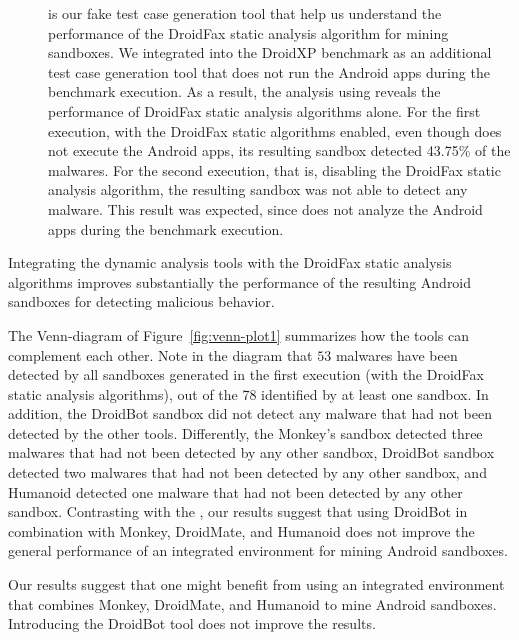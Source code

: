 \begin{description}
  \item[\joke] is our fake test case generation tool that help us understand the performance of the DroidFax static analysis algorithm for mining sandboxes.
    We integrated \joke into the DroidXP benchmark as an additional test case generation tool that does not run the Android apps during the benchmark execution.
    As a result, the analysis using \joke reveals the performance of DroidFax static analysis algorithms alone. For the first execution, with the DroidFax static
    algorithms enabled, even though \joke does not execute the Android apps, its resulting sandbox detected 43.75\% of the malwares. For the second execution,
    that is, disabling the DroidFax static analysis algorithm, the resulting \joke sandbox was not able to detect any malware. This result
    was expected, since \joke does not analyze the Android apps during the benchmark execution.

\end{description}


\begin{finding}
  Integrating the dynamic analysis tools
  with the DroidFax static analysis algorithms
  improves substantially the performance
  of the resulting Android sandboxes for
  detecting malicious behavior. 
\end{finding}
 
The Venn-diagram of Figure~\ref{fig:venn-plot1}
summarizes how the tools can complement each other.
Note in the diagram that $53$ malwares have been detected by all sandboxes generated in the first execution (with the DroidFax static analysis algorithms), out of the 78 identified by at least one sandbox. In addition, the DroidBot sandbox did not detect any malware that had not been detected by the other tools. Differently, the Monkey's sandbox detected three malwares that had not been detected by any other sandbox, DroidBot sandbox detected two malwares that had not been detected by any other sandbox, and Humanoid detected one malware that had not been detected by any other sandbox. Contrasting with the \blls,
our results suggest that using DroidBot in combination with Monkey, DroidMate, and Humanoid does not improve the general performance of an integrated environment for mining
Android sandboxes.

\begin{finding}
  Our results suggest that one might benefit from using  an integrated
  environment that combines Monkey, DroidMate, and Humanoid to
  mine Android sandboxes. Introducing the DroidBot 
  tool does not improve the results.
\end{finding}


